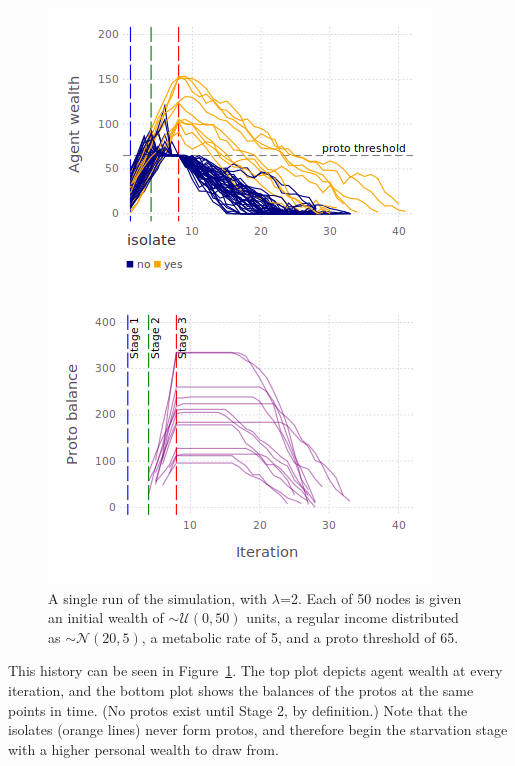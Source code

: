\begin{figure}[ht]
\centering
\includegraphics[width=\columnwidth]{figures/sampleLifeHistory.png}
\caption{A single run of the simulation, with $\lambda$=2. Each of 50 nodes is
given an initial wealth of $\sim\mathcal{U}(0,50)$ units, a regular income
distributed as $\sim\mathcal{N}(20,5)$, a metabolic rate of 5, and a proto
threshold of 65.} \label{fig:singleRun}
\end{figure}

This history can be seen in Figure~\ref{fig:singleRun}. The top plot depicts
agent wealth at every iteration, and the bottom plot shows the balances of the
protos at the same points in time. (No protos exist until Stage 2, by
definition.) Note that the isolates (orange lines) never form protos, and
therefore begin the starvation stage with a higher personal wealth to draw
from.


